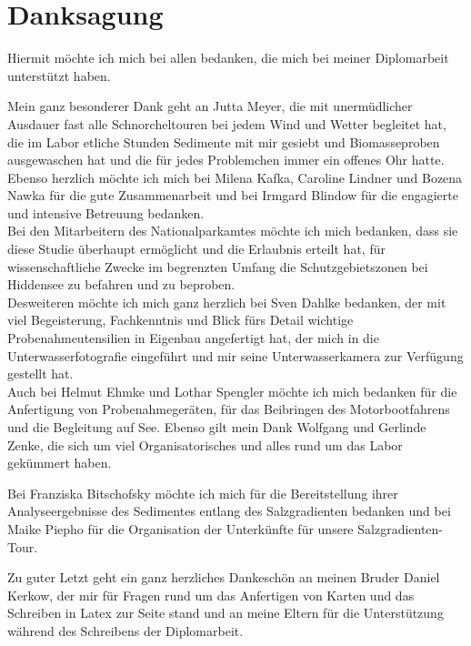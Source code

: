 \section*{Danksagung}

Hiermit möchte ich mich bei allen bedanken, die mich bei meiner Diplomarbeit unterstützt haben.

Mein ganz besonderer Dank geht an Jutta Meyer, die mit unermüdlicher Ausdauer fast alle Schnorcheltouren bei jedem Wind und Wetter begleitet hat, die im Labor etliche Stunden Sedimente mit mir gesiebt und Biomasseproben ausgewaschen hat und die für jedes Problemchen immer ein offenes Ohr hatte. Ebenso herzlich möchte ich mich bei Milena Kafka, Caroline Lindner und Bozena Nawka für die gute Zusammenarbeit und bei Irmgard Blindow für die engagierte und intensive Betreuung bedanken. \\
Bei den Mitarbeitern des Nationalparkamtes möchte ich mich bedanken, dass sie diese Studie überhaupt ermöglicht und die Erlaubnis erteilt hat, für wissenschaftliche Zwecke im begrenzten Umfang die Schutzgebietszonen bei Hiddensee zu befahren und zu beproben.\\
Desweiteren möchte ich mich ganz herzlich bei Sven Dahlke bedanken, der mit viel Begeisterung, Fachkenntnis und Blick fürs Detail wichtige Probenahmeutensilien in Eigenbau angefertigt hat, der mich in die Unterwasserfotografie eingeführt und mir seine Unterwasserkamera zur Verfügung gestellt hat.\\ 
Auch bei Helmut Ehmke und Lothar Spengler möchte ich mich bedanken für die Anfertigung von Probenahmegeräten, für das Beibringen des Motorbootfahrens und die Begleitung auf See. Ebenso gilt mein Dank Wolfgang und Gerlinde Zenke, die sich um viel Organisatorisches und alles rund um das Labor gekümmert haben.

Bei Franziska Bitschofsky möchte ich mich für die Bereitstellung ihrer Analyseergebnisse des Sedimentes entlang des Salzgradienten bedanken und bei Maike Piepho für die Organisation der Unterkünfte für unsere Salzgradienten-Tour.

Zu guter Letzt geht ein ganz herzliches Dankeschön an meinen Bruder Daniel Kerkow, der mir für Fragen rund um das Anfertigen von Karten und das Schreiben in Latex zur Seite stand und an meine Eltern für die Unterstützung während des Schreibens der Diplomarbeit.


\newpage %

